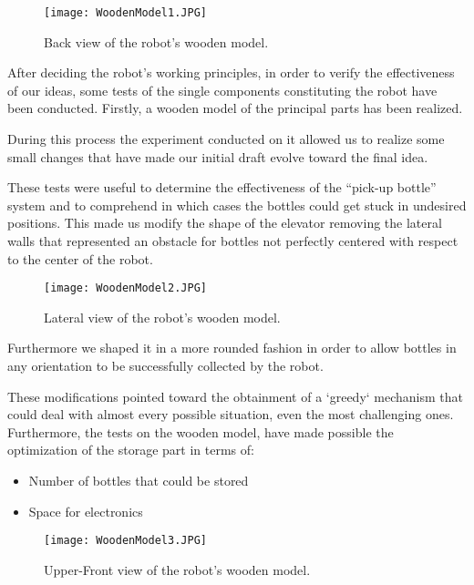 \begin{wrapfigure}{l}{0.5\textwidth}
\begin{center}
\texttt{[image: WoodenModel1.JPG]}
\end{center}
\caption{Back view of the robot's wooden model.}
\label{fig:WoodenModel1}
\end{wrapfigure}

After deciding the robot's working principles, in order to verify the effectiveness of our ideas, some tests of the single components constituting the robot have been conducted.
Firstly, a wooden model of the principal parts has been realized.


During this process the experiment conducted on it allowed us to realize some small changes that have made our initial draft evolve toward the final idea.

These tests were useful to determine the effectiveness of the “pick-up bottle” system and to comprehend in which cases the bottles could get stuck in undesired positions. This made us modify the shape of the elevator removing the lateral walls that represented an obstacle for bottles not perfectly centered with respect to the center of the robot.


\begin{wrapfigure}{r}{0.5\textwidth}
\begin{center}
\texttt{[image: WoodenModel2.JPG]}
\end{center}
\caption{Lateral view of the robot's wooden model.}
\label{fig:WoodenModel2}
\end{wrapfigure}

Furthermore we shaped it in a more rounded fashion in order to allow bottles in any orientation to be successfully collected by the robot.

These modifications pointed toward the obtainment of a `greedy` mechanism that could deal with almost every possible situation, even the most challenging ones.
Furthermore, the tests on the wooden model, have made possible the optimization of the storage part in terms of:

\begin{itemize}
\item Number of bottles that could be stored
\item Space for electronics
\end{itemize}

\begin{wrapfigure}{l}{0.5\textwidth}
\begin{center}
 \texttt{[image: WoodenModel3.JPG]}
\end{center} 
 \caption{Upper-Front view of the robot's wooden model.}
\label{fig:WoodenModel3}
\end{wrapfigure}

